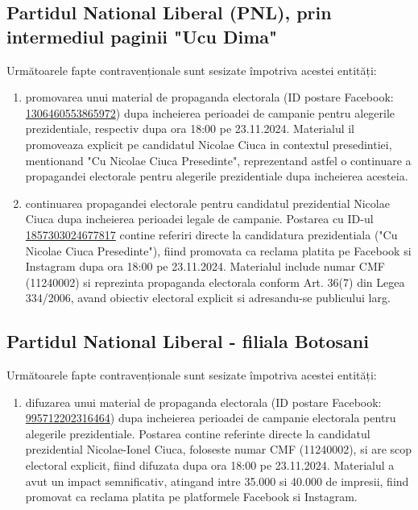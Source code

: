\documentclass[a4paper,12pt]{article}
\begin{document}
\subsection{Partidul National Liberal (PNL), prin intermediul paginii "Ucu Dima"}
Următoarele fapte contravenționale sunt sesizate împotriva acestei entități:

\begin{enumerate}[leftmargin=*, label=\arabic*.)]
    \item promovarea unui material de propaganda electorala (ID postare Facebook: \href{https://www.facebook.com/ads/library/?id=1306460553865972}{1306460553865972}) dupa incheierea perioadei de campanie pentru alegerile prezidentiale, respectiv dupa ora 18:00 pe 23.11.2024. Materialul il promoveaza explicit pe candidatul Nicolae Ciuca in contextul presedintiei, mentionand "Cu Nicolae Ciuca Presedinte", reprezentand astfel o continuare a propagandei electorale pentru alegerile prezidentiale dupa incheierea acesteia.
    \item continuarea propagandei electorale pentru candidatul prezidential Nicolae Ciuca dupa incheierea perioadei legale de campanie. Postarea cu ID-ul \href{https://www.facebook.com/ads/library/?id=1857303024677817}{1857303024677817} contine referiri directe la candidatura prezidentiala ("Cu Nicolae Ciuca Presedinte"), fiind promovata ca reclama platita pe Facebook si Instagram dupa ora 18:00 pe 23.11.2024. Materialul include numar CMF (11240002) si reprezinta propaganda electorala conform Art. 36(7) din Legea 334/2006, avand obiectiv electoral explicit si adresandu-se publicului larg.
\end{enumerate}

\vspace{0.5cm}

\subsection{Partidul National Liberal - filiala Botosani}
Următoarele fapte contravenționale sunt sesizate împotriva acestei entități:

\begin{enumerate}[leftmargin=*, label=\arabic*.)]
    \item difuzarea unui material de propaganda electorala (ID postare Facebook: \href{https://www.facebook.com/ads/library/?id=995712202316464}{995712202316464}) dupa incheierea perioadei de campanie electorala pentru alegerile prezidentiale. Postarea contine referinte directe la candidatul prezidential Nicolae-Ionel Ciuca, foloseste numar CMF (11240002), si are scop electoral explicit, fiind difuzata dupa ora 18:00 pe 23.11.2024. Materialul a avut un impact semnificativ, atingand intre 35.000 si 40.000 de impresii, fiind promovat ca reclama platita pe platformele Facebook si Instagram.
\end{enumerate}
\end{document}
